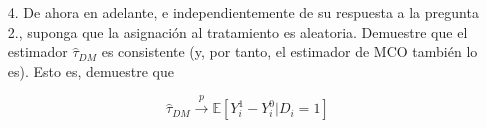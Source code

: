 \documentclass[a4paper, answers, addpoints, 11pt]{exam}
\begin{document}
\begin{itemize}
\begin{mdframed}
\begin{proof}
\begin{align*}
    &= \frac{1}{N} \left( \sum_{i:D_i=1} (1 - \frac{N_1}{N}) (Y_i - \bar{Y}) + \sum_{i:D_i=0} (0-\frac{N_1}{N}) (Y_i - \bar{Y}) \right) \\  
    &= \frac{1}{N} \left[ \sum_{i:D_i=1} Y_i \frac{N_0}{N} - \frac{N_0}{N} \sum_{i:D_i=1} \bar{Y}- \sum_{i:D_i=0} \frac{N_1}{N} Y_i + \frac{N_1}{N} \sum_{i:D_i=0}\bar{Y} \right]  \\
     &= \frac{1}{N} \left[ \sum_{i:D_i=1} Y_i \frac{N_0}{N} - \frac{N_0}{N} \bar{Y}N_1- \sum_{i:D_i=0} \frac{N_1}{N} Y_i + \frac{N_1}{N} \bar{Y}N_0 \right]\\ 
     &= \frac{1}{N} \left[ \sum_{i:D_i=1} Y_i \frac{N_0}{N} - \sum_{i:D_i=0} \frac{N_1}{N} Y_i \right]\\ 
     &= \frac{1}{N} \left[\frac{N_0}{N} \sum_{i:D_i=1} Y_i  - \frac{N_1}{N}\sum_{i:D_i=0}  Y_i \right]
    \end{align*}
    Para el denominador, tenemos que $\text{Var}(D) = \frac{N_1}{N} \frac{N_0}{N}$.Luego,
    \begin{align*}
    \hat{\tau}_{MCO} &= \frac{\frac{1}{N} \left(\frac{N_0}{N} \sum_{i:D_i=1} Y_i - \frac{N_1}{N} \sum_{i:D_i=0} Y_i \right)}{Var(D)}\\
    &= \frac{\frac{1}{N} \left(\frac{N_0}{N} \sum_{i:D_i=1} Y_i  \right)}{\frac{N_1}{N} \frac{N_0}{N}} -\frac{\frac{1}{N} \left( \frac{N_1}{N} \sum_{i:D_i=0} Y_i \right)}{\frac{N_1}{N} \frac{N_0}{N}}\\
    &= \frac{1}{N_1} \sum_{i:D_i=1} Y_i - \frac{1}{N_0} \sum_{i:D_i=0} Y_i\\ &= \hat{\tau}_{DM}
    \end{align*}
    \end{proof}
     
\end{mdframed}

    

    \item[4.] De ahora en adelante, e independientemente de su respuesta a la pregunta 2., suponga que la asignación al tratamiento es aleatoria. Demuestre que el estimador $\hat\tau_{DM}$ es consistente (y, por tanto, el estimador de MCO también lo es). Esto es, demuestre que

    \begin{equation*}
        \hat\tau_{DM} \overset{p}{\longrightarrow} \mathbb{E}[Y^{1}_{i} - Y^{0}_{i} | D_i = 1]
    \end{equation*}


\end{itemize}
\end{document}
